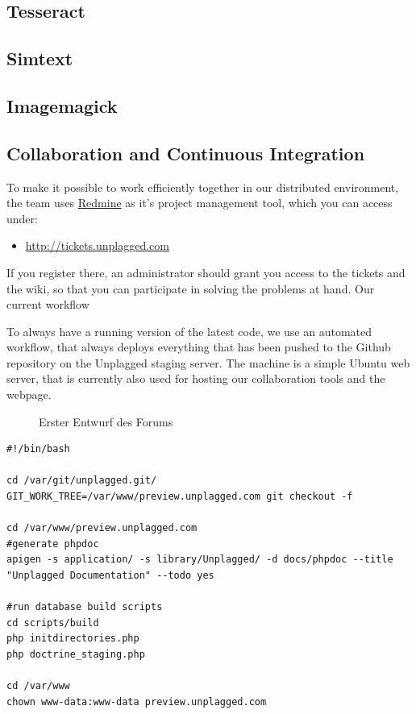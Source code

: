 \subsection{Tesseract}
\subsection{Simtext}
\subsection{Imagemagick}

\subsection{Collaboration and Continuous Integration}

To make it possible to work efficiently together in our distributed environment, the team uses 
\href{http://www.redmine.org/}{Redmine} as it's project management tool, which you can access under:

\begin{itemize}
\item \url{http://tickets.unplagged.com}
\end{itemize}

If you register there, an administrator should grant you access to the tickets and the wiki, so that you can participate
in solving the problems at hand. Our current workflow

To always have a running version of the latest code, we use an automated workflow, that always deploys everything that 
has been pushed to the Github repository on the Unplagged staging server. The machine is a simple Ubuntu web server, that
is currently also used for hosting our collaboration tools and the webpage.



\begin{figure}[!h]
  \centering
  \caption{Erster Entwurf des Forums}
  \label{}
\end{figure}

\lstset{language=bash}
\begin{lstlisting}[caption=Deployment script]
#!/bin/bash

cd /var/git/unplagged.git/
GIT_WORK_TREE=/var/www/preview.unplagged.com git checkout -f

cd /var/www/preview.unplagged.com
#generate phpdoc
apigen -s application/ -s library/Unplagged/ -d docs/phpdoc --title "Unplagged Documentation" --todo yes

#run database build scripts
cd scripts/build
php initdirectories.php
php doctrine_staging.php

cd /var/www
chown www-data:www-data preview.unplagged.com
\end{lstlisting}




